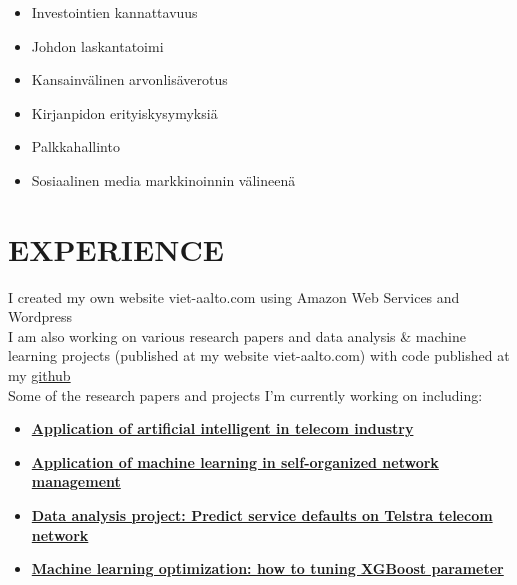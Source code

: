 \documentclass[letterpaper]{twentysecondcv} %
\begin{document}
	
	
	
\newpage
\makenewprofile

\hspace{13pt}
\vspace{4mm} 

	\begin{multicols}{2}
	\begin{itemize}[noitemsep]
		\item Investointien kannattavuus
		\item Johdon laskantatoimi
		\item Kansainvälinen arvonlisäverotus
		\item Kirjanpidon erityiskysymyksiä
		\item Palkkahallinto
		\item Sosiaalinen media markkinoinnin välineenä
	\end{itemize} 
\end{multicols}
\section{EXPERIENCE}
I created my own website viet-aalto.com using Amazon Web Services and Wordpress \\

I am also working on various research papers and data analysis \& machine learning projects (published at my website viet-aalto.com)  with code published at my \href{github.com/vietaalto}{github} \\
Some of the research papers and projects I'm currently working on including:


\begin{itemize} %
	\item
	\href{http://viet-aalto.com/index.php/2018/02/06/application-of-ai-in-telecom-industry/}{\textbf{Application of artificial intelligent in telecom industry}}
	\item \href{http://viet-aalto.com/index.php/2018/02/06/application-of-machine-learning-in-self-organized-network-management}{\textbf{Application of machine learning in self-organized network management}}
	\item
	\href{http://viet-aalto.com/index.php/2018/02/06/telstra-network-disruptions/}{\textbf{Data analysis project: Predict service defaults on Telstra telecom network}}
		\item
	\href{http://viet-aalto.com/index.php/2018/01/14/xgboost-tuning/}{\textbf{Machine learning optimization: how to tuning XGBoost parameter}}
\end{itemize}
\end{document}
